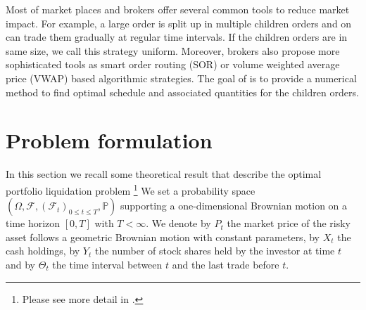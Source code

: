 \documentclass[a4paper,10pt]{article}
\begin{document}
\par Most of market places and brokers offer several common tools to reduce market impact. For example, a large order is split up in multiple children orders and on can trade them gradually at regular time intervals. If the children orders are in same size, we call this strategy uniform. Moreover, brokers also propose more sophisticated tools as smart order routing (SOR) or volume weighted average price (VWAP) based algorithmic strategies. The goal of \cite{GMP} is to provide a numerical method to find optimal schedule and associated quantities for the children orders. 

\section{Problem formulation}
In this section we recall some theoretical result that describe the optimal portfolio liquidation problem \footnote{Please see more detail in \cite{KP}.} We set a probability space $\left(\Omega,\mathcal{F}, \left(\mathcal{F}_t\right)_{0\le t\le T}, \mathbb{P}\right)$ supporting a one-dimensional Brownian motion on a time horizon $[0, T]$ with $T < \infty$. We denote by $P_t$
the market price of the risky asset follows a geometric Brownian motion with constant parameters, by $X_t$ the cash holdings, by $Y_t$ the number of stock shares held by the investor at time $t$ and by $\Theta_t$ the time interval between $t$ and the last trade before $t$. 
\end{document}
